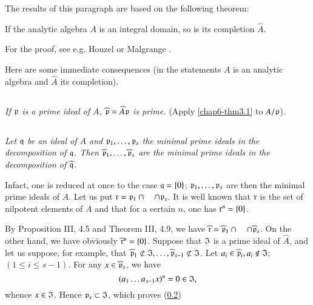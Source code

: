 The results of this paragraph are based on the following theorem:

\begin{theorem}\label{chap6-thm3.1}
If the analytic algebra $A$ is an integral domain, so is its completion $\widehat{A}$.
\end{theorem}

For the proof, see e.g. Houzel \cite{C. Houzel : 1} or Malgrange \cite{B. Malgrange : 3}.

Here are some immediate consequences (in the statements $A$ is an analytic algebra and $\widehat{A}$ its completion).

\setcounter{subsection}{1}
\subsection{}\label{chap6-sec3.2}
{\em If $\mathfrak{p}$ is a prime ideal of $A$, $\widehat{\mathfrak{p}}=\widehat{A}\mathfrak{p}$ is prime.} (Apply \eqref{chap6-thm3.1} to $A/\mathfrak{p}$).

\subsection{}\label{chap6-sec3.3}
{\em Let $\mathfrak{q}$ be an ideal of $A$ and $\mathfrak{p}_{1},\ldots,\mathfrak{p}_{s}$ the minimal prime ideals in the decomposition of $\mathfrak{q}$. Then $\widehat{\mathfrak{p}}_{1},\ldots,\widehat{\mathfrak{p}}_{s}$ are the minimal prime ideals in the decomposition of $\widehat{\mathfrak{q}}$.}

In\pageoriginale fact, one is reduced at once to the case $\mathfrak{q}=\{0\}$; $\mathfrak{p}_{1},\ldots,\mathfrak{p}_{s}$ are then the minimal prime ideals of $A$. Let us put $\mathfrak{r}=\mathfrak{p}_{1}\cap\quad \cap \mathfrak{p}_{s}$. It is well known that $\mathfrak{r}$ is the set of nilpotent elements of $A$ and that for a certain $n$, one has $\mathfrak{r}^{n}=\{0\}$.

By Proposition III, 4.5 and Theorem III, 4.9, we have $\widehat{\mathfrak{r}}=\widehat{\mathfrak{p}}_{1}\cap\quad\cap \widehat{\mathfrak{p}}_{s}$. On the other hand, we have obviously $\widehat{\mathfrak{r}}^{n}=\{0\}$. Suppose that $\mathfrak{I}$ is a prime ideal of $\widehat{A}$, and let us suppose, for example, that $\widehat{\frakp}_{1}\nsubset \frakI,\ldots,\widehat{\frakp}_{s-1}\nsubset \frakI$. Let $a_{i}\in \widehat{\mathfrak{p}}_{i},a_{i}\not\in \mathfrak{I}$; $(1\leq i\leq s-1)$. For any $x\in \widehat{\mathfrak{p}}_{s}$, we have
$$
(a_{1}\ldots a_{s-1}x)^{n}=0\in\mathfrak{I},
$$
whence $x\in \mathfrak{I}$. Hence $\mathfrak{p}_{s}\subset \mathfrak{I}$, which proves (\ref{chap6-sec3.3})

